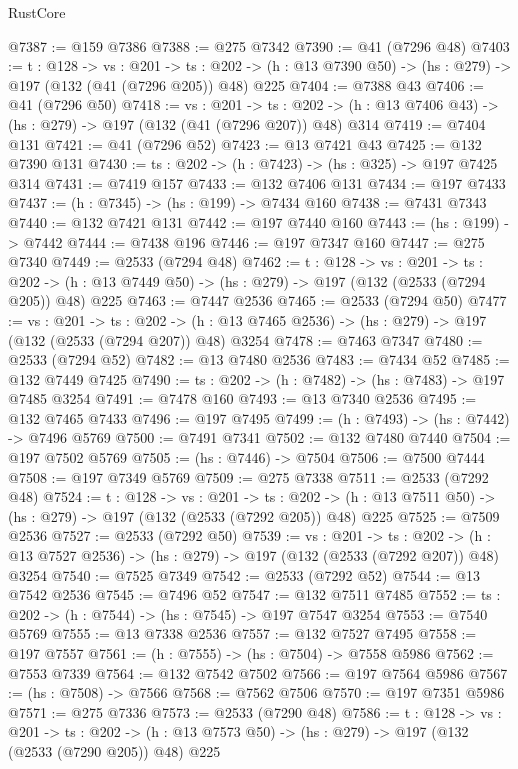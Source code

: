 \begin{lexlean}{RustCore}
\begin{coremodule}
@7387 := @159 @7386
@7388 := @275 @7342
@7390 := @41 (@7296 @48)
@7403 := {t : @128} ->
  {vs : @201} ->
  {ts : @202} -> (h : @13 @7390 @50) -> (hs : @279) -> @197 (@132 (@41 (@7296 @205)) @48) @225
@7404 := @7388 @43
@7406 := @41 (@7296 @50)
@7418 := {vs : @201} ->
  {ts : @202} -> (h : @13 @7406 @43) -> (hs : @279) -> @197 (@132 (@41 (@7296 @207)) @48) @314
@7419 := @7404 @131
@7421 := @41 (@7296 @52)
@7423 := @13 @7421 @43
@7425 := @132 @7390 @131
@7430 := {ts : @202} -> (h : @7423) -> (hs : @325) -> @197 @7425 @314
@7431 := @7419 @157
@7433 := @132 @7406 @131
@7434 := @197 @7433
@7437 := (h : @7345) -> (hs : @199) -> @7434 @160
@7438 := @7431 @7343
@7440 := @132 @7421 @131
@7442 := @197 @7440 @160
@7443 := (hs : @199) -> @7442
@7444 := @7438 @196
@7446 := @197 @7347 @160
@7447 := @275 @7340
@7449 := @2533 (@7294 @48)
@7462 := {t : @128} ->
  {vs : @201} ->
  {ts : @202} -> (h : @13 @7449 @50) -> (hs : @279) -> @197 (@132 (@2533 (@7294 @205)) @48) @225
@7463 := @7447 @2536
@7465 := @2533 (@7294 @50)
@7477 := {vs : @201} ->
  {ts : @202} -> (h : @13 @7465 @2536) -> (hs : @279) -> @197 (@132 (@2533 (@7294 @207)) @48) @3254
@7478 := @7463 @7347
@7480 := @2533 (@7294 @52)
@7482 := @13 @7480 @2536
@7483 := @7434 @52
@7485 := @132 @7449 @7425
@7490 := {ts : @202} -> (h : @7482) -> (hs : @7483) -> @197 @7485 @3254
@7491 := @7478 @160
@7493 := @13 @7340 @2536
@7495 := @132 @7465 @7433
@7496 := @197 @7495
@7499 := (h : @7493) -> (hs : @7442) -> @7496 @5769
@7500 := @7491 @7341
@7502 := @132 @7480 @7440
@7504 := @197 @7502 @5769
@7505 := (hs : @7446) -> @7504
@7506 := @7500 @7444
@7508 := @197 @7349 @5769
@7509 := @275 @7338
@7511 := @2533 (@7292 @48)
@7524 := {t : @128} ->
  {vs : @201} ->
  {ts : @202} -> (h : @13 @7511 @50) -> (hs : @279) -> @197 (@132 (@2533 (@7292 @205)) @48) @225
@7525 := @7509 @2536
@7527 := @2533 (@7292 @50)
@7539 := {vs : @201} ->
  {ts : @202} -> (h : @13 @7527 @2536) -> (hs : @279) -> @197 (@132 (@2533 (@7292 @207)) @48) @3254
@7540 := @7525 @7349
@7542 := @2533 (@7292 @52)
@7544 := @13 @7542 @2536
@7545 := @7496 @52
@7547 := @132 @7511 @7485
@7552 := {ts : @202} -> (h : @7544) -> (hs : @7545) -> @197 @7547 @3254
@7553 := @7540 @5769
@7555 := @13 @7338 @2536
@7557 := @132 @7527 @7495
@7558 := @197 @7557
@7561 := (h : @7555) -> (hs : @7504) -> @7558 @5986
@7562 := @7553 @7339
@7564 := @132 @7542 @7502
@7566 := @197 @7564 @5986
@7567 := (hs : @7508) -> @7566
@7568 := @7562 @7506
@7570 := @197 @7351 @5986
@7571 := @275 @7336
@7573 := @2533 (@7290 @48)
@7586 := {t : @128} ->
  {vs : @201} ->
  {ts : @202} -> (h : @13 @7573 @50) -> (hs : @279) -> @197 (@132 (@2533 (@7290 @205)) @48) @225

\end{coremodule}
\end{lexlean}
